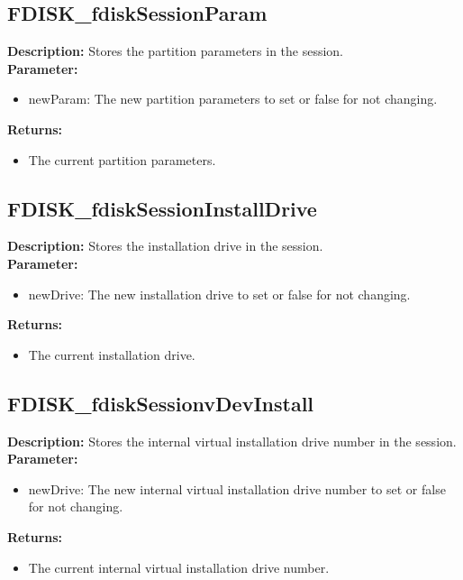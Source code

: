 \subsection{FDISK\_fdiskSessionParam}
\textbf{Description:} Stores the partition parameters in the session.\\
\textbf{Parameter:}
\begin{itemize}
\item newParam: The new partition parameters to set or false for not changing.
\end{itemize}
\textbf{Returns:}
\begin{itemize}
\item The current partition parameters.
\end{itemize}

\subsection{FDISK\_fdiskSessionInstallDrive}
\textbf{Description:} Stores the installation drive in the session.\\
\textbf{Parameter:}
\begin{itemize}
\item newDrive: The new installation drive to set or false for not changing.
\end{itemize}
\textbf{Returns:}
\begin{itemize}
\item The current installation drive.
\end{itemize}

\subsection{FDISK\_fdiskSessionvDevInstall}
\textbf{Description:} Stores the internal virtual installation drive number in the session.\\
\textbf{Parameter:}
\begin{itemize}
\item newDrive: The new internal virtual installation drive number to set or false for not changing.
\end{itemize}
\textbf{Returns:}
\begin{itemize}
\item The current internal virtual installation drive number.
\end{itemize}

